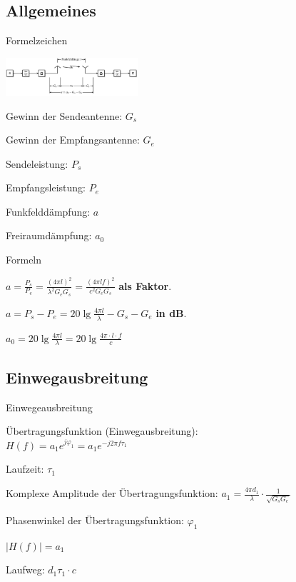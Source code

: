 \documentclass[german]{latex4ei/latex4ei_sheet}
\begin{document}
    \subsection{Allgemeines}
    \begin{sectionbox}
        \begin{symbolbox}{Formelzeichen}
            \item \includegraphics[width=185px]{img/Funkuebertragungssystem.png}
            \item Gewinn der Sendeantenne: $G_s$
            \item Gewinn der Empfangsantenne: $G_e$
            \item Sendeleistung: $P_s$
            \item Empfangsleistung: $P_e$
            \item Funkfelddämpfung: $a$
            \item Freiraumdämpfung: $a_0$
        \end{symbolbox}
        
        \begin{bluebox}{Formeln}
            \item $a = \frac{P_s}{P_e} = \frac{(4\pi l)^2}{\lambda^2 G_e G_s} = \frac{(4\pi l f)^2}{c^2 G_e G_s}$ \textbf{als Faktor}.
            \item $a = P_s - P_e = 20\lg \frac{4\pi l}{\lambda}-G_s-G_e$ \textbf{in dB}.
            \item $a_0 = 20\lg \frac{4\pi l}{\lambda} = 20\lg \frac{4\pi\cdot l \cdot f}{c}$
        \end{bluebox}
    \end{sectionbox}
    \begin{sectionbox}   
        \subsection{Einwegausbreitung}
    \begin{symbolbox}{Einwegeausbreitung}
        \item Übertragungsfunktion (Einwegausbreitung):\\ $H(f) = a_1 e^{j\varphi_1} = a_1 e^{-j 2 \pi f \tau_1}$
        \item Laufzeit: $\tau_1$
        \item Komplexe Amplitude der Übertragungsfunktion: $a_1 = \frac{4\pi d_1}{\lambda}\cdot \frac{1}{\sqrt{G_s G_e}}$
        \item Phasenwinkel der Übertragungsfunktion: $\varphi_1$
        \item $|H(f)| = a_1$
        \item Laufweg: $d_1\tau_1 \cdot c$
    \end{symbolbox}
\end{sectionbox}
    
\end{document}
